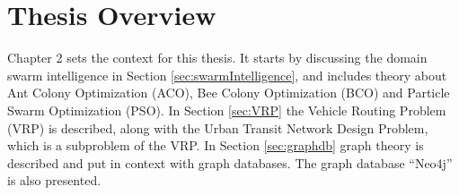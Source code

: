 \section{Thesis Overview}



Chapter 2 sets the context for this thesis. It starts by discussing the domain swarm intelligence in Section \ref{sec:swarmIntelligence}, and includes theory about Ant Colony Optimization (ACO), Bee Colony Optimization (BCO) and Particle Swarm Optimization (PSO). In Section \ref{sec:VRP} the Vehicle Routing Problem (VRP) is described, along with the Urban Transit Network Design Problem, which is a subproblem of the VRP. In Section \ref{sec:graphdb} graph theory is described and put in context with graph databases. The graph database ``Neo4j'' is also presented. 
